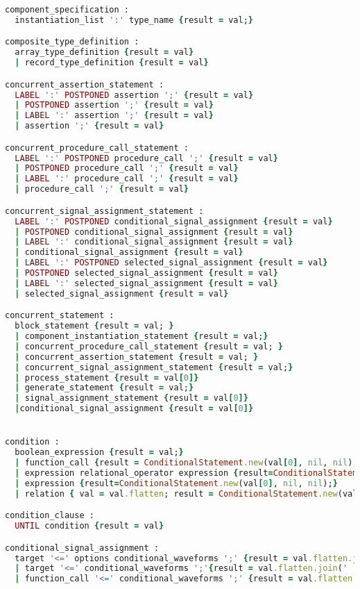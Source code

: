 \begin{lstlisting}[language=Ruby, style=rubystyle]
component_specification :
  instantiation_list ':' type_name {result = val;}

composite_type_definition :
  array_type_definition {result = val}
  | record_type_definition {result = val}

concurrent_assertion_statement :
  LABEL ':' POSTPONED assertion ';' {result = val}
  | POSTPONED assertion ';' {result = val}
  | LABEL ':' assertion ';' {result = val}
  | assertion ';' {result = val}

concurrent_procedure_call_statement :
  LABEL ':' POSTPONED procedure_call ';' {result = val}
  | POSTPONED procedure_call ';' {result = val}
  | LABEL ':' procedure_call ';' {result = val}
  | procedure_call ';' {result = val}

concurrent_signal_assignment_statement :
  LABEL ':' POSTPONED conditional_signal_assignment {result = val}
  | POSTPONED conditional_signal_assignment {result = val}
  | LABEL ':' conditional_signal_assignment {result = val}
  | conditional_signal_assignment {result = val}
  | LABEL ':' POSTPONED selected_signal_assignment {result = val}
  | POSTPONED selected_signal_assignment {result = val}
  | LABEL ':' selected_signal_assignment {result = val}
  | selected_signal_assignment {result = val}

concurrent_statement :
  block_statement {result = val; }
  | component_instantiation_statement {result = val;}
  | concurrent_procedure_call_statement {result = val; }
  | concurrent_assertion_statement {result = val; }
  | concurrent_signal_assignment_statement {result = val;}
  | process_statement {result = val[0]}
  | generate_statement {result = val;}
  | signal_assignment_statement {result = val[0]}
  |conditional_signal_assignment {result = val[0]}


condition :
  boolean_expression {result = val;}
  | function_call {result = ConditionalStatement.new(val[0], nil, nil);}
  | expression relational_operator expression {result=ConditionalStatement.new(val[0], val[1], val[2]);val;}
  | expression {result=ConditionalStatement.new(val[0], nil, nil);}
  | relation { val = val.flatten; result = ConditionalStatement.new(val[0], val[1], val[2]);val; }

condition_clause :
  UNTIL condition {result = val}

conditional_signal_assignment :
  target '<=' options conditional_waveforms ';' {result = val.flatten.join(' ')}
  | target '<=' conditional_waveforms ';'{result = val.flatten.join(' ')}
  | function_call '<=' conditional_waveforms ';' {result = val.flatten.join(' ')}


\end{lstlisting}
